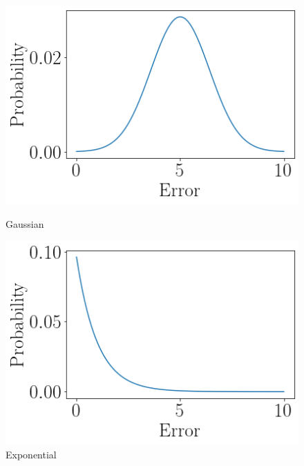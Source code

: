 \begin{figure}[ht]
    \begin{minipage}[b]{0.5\linewidth}
        \centering
        \includegraphics[width=\linewidth]{./img/distributions/normal.png}
        \caption{Gaussian}
        \vspace{4ex}
        \label{n_5_2_hist}
    \end{minipage}%
    \begin{minipage}[b]{0.5\linewidth}
        \centering
        \includegraphics[width=\linewidth]{./img/distributions/exponential.png}
        \caption{Exponential}
        \vspace{4ex}
    \end{minipage}
    \begin{minipage}[b]{0.5\linewidth}
        \centering

\end{minipage}
\end{figure}

